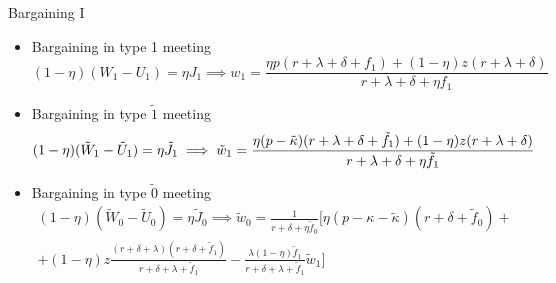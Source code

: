 \documentclass[9pt,xcolor={svgnames}]{beamer}
\begin{document}

\begin{frame}{Bargaining I}
\begin{itemize}

    \item Bargaining in type 1 meeting
    \begin{equation*}
    (1-\eta)(W_1-U_1) = \eta J_1 \implies w_1 = \frac{\eta p (r+\lambda+\delta+f_1)+(1-\eta)z(r+\lambda+\delta)}{r+\lambda+\delta + \eta f_1}
    \end{equation*}
    
     \item Bargaining in type $\tilde{1}$ meeting
    \begin{equation*}
        (1-\eta)(\tilde{W}_1-\tilde{U}_1) = \eta \tilde{J}_1 \implies \tilde{w}_1 = \frac{\eta (p-\Tilde{\kappa}) (r+\lambda+\delta+\tilde{f}_1)+(1-\eta)z(r+\lambda+\delta)}{r+\lambda+\delta + \eta \tilde{f}_1}
    \end{equation*}
    
    \item Bargaining in type $\tilde{0}$ meeting
    \begin{equation*}
    \begin{split}
        (1-\eta)(\tilde{W}_0-\tilde{U}_0) = \eta \tilde{J}_0 \implies \tilde{w}_0 = \frac{1}{r+\delta+\eta \tilde{f}_0} \Big[ \eta(p-\kappa-\tilde{\kappa})(r+\delta+\tilde{f}_0) + \\ + (1-\eta)z \frac{(r+\delta+\lambda) (r+\delta+\tilde{f}_1)} {r+\delta+\lambda+\tilde{f}_1}-\frac{\lambda(1-\eta)\tilde{f}_1}{r+\delta+\lambda+\tilde{f}_1} \tilde{w}_{1} \Big]
        \end{split}
    \end{equation*}
    
\end{itemize}
\end{frame}



\end{document}
